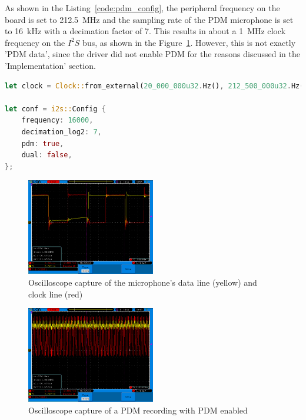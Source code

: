 As shown in the Listing~\ref{code:pdm_config}, the peripheral frequency on the board is set to \SI{212.5}{\mega\hertz}
and the sampling rate of the PDM microphone is set to \SI{16}{\kilo\hertz} with a decimation factor of 7.
This results in about a \SI{1}{\mega\hertz} clock frequency on the $I^2S$ bus, as shown in the Figure~\ref{fig:i2s_capture}.
However, this is not exactly 'PDM data', since the driver did not enable PDM for the reasons discussed in the 'Implementation' section.

\begin{minipage}{\textwidth}
\begin{lstlisting}[style=colorEX,language=Rust,caption={Configuration of the board clock and the PDM driver},label={code:pdm_config}]
let clock = Clock::from_external(20_000_000u32.Hz(), 212_500_000u32.Hz());

let conf = i2s::Config {
    frequency: 16000,
    decimation_log2: 7,
    pdm: true,
    dual: false,
};
\end{lstlisting}
\end{minipage}

\begin{figure}[H]
    \begin{center}
        \includegraphics[width=0.5\textwidth]{figures/i2s_capture.png}
    \end{center}
    \caption[Oscilloscope capture of the microphone's data line (yellow) and clock line (red)]{Oscilloscope capture of the microphone's data line (yellow) and clock line (red)}
    \label{fig:i2s_capture}
\end{figure}

\begin{figure}[H]
    \begin{center}
        \includegraphics[width=0.5\textwidth]{figures/pdm_broken.png}
    \end{center}
    \caption[Oscilloscope capture of a PDM recording with PDM enabled]{Oscilloscope capture of a PDM recording with PDM enabled}
    \label{fig:pdm_no_config}
\end{figure}

